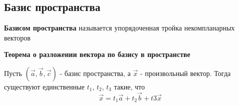 \documentclass[a4paper]{article}
\begin{document}
\subsection*{Базис пространства}
\textbf{Базисом пространства }называется упорядоченная тройка некомпланарных
векторов

\begin{htheorem}
\textbf{Теорема о разложении вектора по базису в пространстве}

Пусть $( \vec{a}, \vec{b}, \vec{c})$ - базис пространства, а $\vec{x}$ - произвольный вектор. Тогда существуют единственные $t_1$, $t_2$, $t_3$ такие, что
\begin{equation}
\vec{x} = t_1 \vec{a} + t_2 \vec{b} + t3 \vec{x}
\end{equation}
\end{htheorem}
\end{document}
